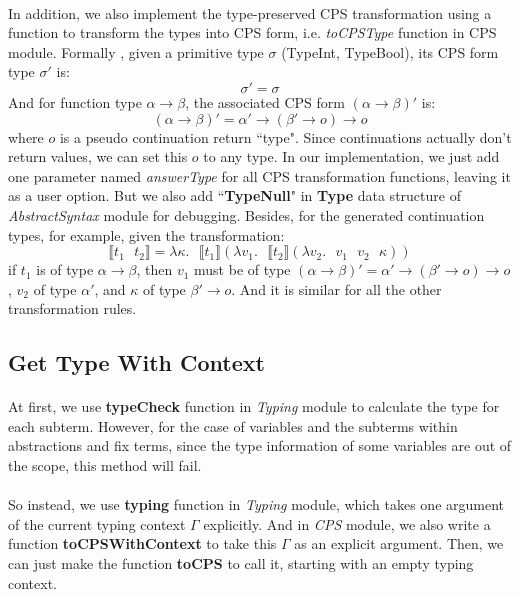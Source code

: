 \documentclass[10pt]{article}
\begin{document}
\paragraph{}
In addition, we also implement the type-preserved CPS transformation using a function to transform the types into CPS form, i.e. \textit{toCPSType} function in CPS module. Formally \cite{typeCPS}, given a primitive type $\sigma$ (TypeInt, TypeBool), its CPS form type $\sigma'$ is:
\[
        \sigma' = \sigma
\]
And for function type $\alpha \rightarrow \beta$, the associated CPS form $(\alpha \rightarrow \beta)'$ is:
\[
        (\alpha \rightarrow \beta)' = \alpha' \rightarrow (\beta' \rightarrow o) \rightarrow o 
\]
where $o$ is a pseudo continuation return ``type". Since continuations actually don't return values, we can set this $o$ to any type. In our implementation, we just add one parameter named \textit{answerType} for all CPS transformation functions, leaving it as a user option. But we also add ``\textbf{TypeNull}" in \textbf{Type} data structure of \emph{AbstractSyntax} module for debugging. Besides, for the generated continuation types, for example, given the transformation:
\[
        \llbracket t_1\text{ }t_2 \rrbracket = \lambda \kappa.\text{ }\llbracket t_1 \rrbracket (\lambda v_1.\text{ }\llbracket t_2 \rrbracket (\lambda v_2.\text{ }v_1\text{ }v_2\text{ }\kappa))
\]
if $t_1$ is of type $\alpha \rightarrow \beta$, then $v_1$ must be of type $(\alpha \rightarrow \beta)' = \alpha' \rightarrow (\beta' \rightarrow o) \rightarrow o$, $v_2$ of type $\alpha'$, and $\kappa$ of type $\beta' \rightarrow o$. And it is similar for all the other transformation rules.

\subsection{Get Type With Context}

\paragraph{}
At first, we use \textbf{typeCheck} function in \emph{Typing} module to calculate the type for each subterm. However, for the case of variables and the subterms within abstractions and fix terms, since the type information of some variables are out of the scope, this method will fail.

\paragraph{}
So instead, we use \textbf{typing} function in \emph{Typing} module, which takes one argument of the current typing context $\Gamma$ explicitly. And in \emph{CPS} module, we also write a function \textbf{toCPSWithContext} to take this $\Gamma$ as an explicit argument. Then, we can just make the function \textbf{toCPS} to call it, starting with an empty typing context.
\end{document}
